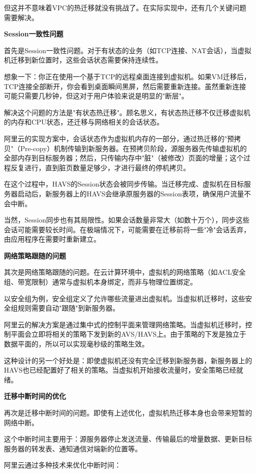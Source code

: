 但这并不意味着VPC的热迁移就没有挑战了。在实际实现中，还有几个关键问题需要解决。

\textbf{Session一致性问题}

首先是Session一致性问题。对于有状态的业务（如TCP连接、NAT会话），当虚拟机迁移到新位置时，这些会话状态需要保持连续性。

想象一下：你正在使用一个基于TCP的远程桌面连接到虚拟机。如果VM迁移后，TCP连接全部断开，你会看到桌面瞬间黑屏，然后需要重新连接。虽然重新连接可能只需要几秒钟，但这对于用户体验来说是明显的"断层"。

解决这个问题的方法是"有状态热迁移"。顾名思义，有状态热迁移不仅迁移虚拟机的内存和CPU状态，还迁移与网络相关的会话状态。

阿里云的实现方案中，会话状态作为虚拟机内存的一部分，通过热迁移的"预拷贝"（Pre-copy）机制传输到新服务器。在预拷贝阶段，源服务器先传输虚拟机的全部内存到目标服务器；然后，只传输内存中"脏"（被修改）页面的增量；这个过程反复进行，直到脏页数量足够少，才进行最终的停机拷贝。

在这个过程中，HAVS的Session状态会被同步传输。当迁移完成、虚拟机在目标服务器启动后，新服务器上的HAVS会继承原服务器的Session表项，确保用户流量不会中断。

当然，Session同步也有其局限性。如果会话数量非常大（如数十万个），同步这些会话可能需要较长时间。在极端情况下，可能需要在迁移前将一些"冷"会话丢弃，由应用程序在需要时重新建立。

\textbf{网络策略跟随的问题}

其次是网络策略跟随的问题。在云计算环境中，虚拟机的网络策略（如ACL安全组、带宽限制）通常与虚拟机本身绑定，而非与物理位置绑定。

以安全组为例，安全组定义了允许哪些流量进出虚拟机。当虚拟机迁移时，这些安全组规则需要自动"跟随"到新服务器。

阿里云的解决方案是通过集中式的控制平面来管理网络策略。当虚拟机迁移时，控制平面会立即将相关的策略下发到新的AVS/HAVS上。由于策略的下发是独立于数据平面的，所以可以实现毫秒级的策略生效。

这种设计的另一个好处是：即使虚拟机还没有完全迁移到新服务器，新服务器上的HAVS也已经配置好了相关的策略。当虚拟机开始接收流量时，安全策略已经就绪。

\textbf{迁移中断时间的优化}

再次是迁移中断时间的问题。即使有上述优化，虚拟机热迁移本身也会带来短暂的网络中断。

这个中断时间主要用于：源服务器停止发送流量、传输最后的增量数据、更新目标服务器的转发表、通知通信对端新的位置等。

阿里云通过多种技术来优化中断时间：


